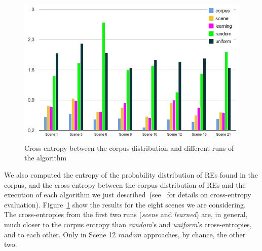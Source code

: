\begin{figure}
\begin{center}
\vspace*{-.7cm}
\hspace*{-.3cm}\includegraphics[width=.55\textwidth]{images/entropy.jpg}
\end{center}
\vspace*{-.5cm}
\caption{Cross-entropy between the corpus distribution and different runs of the algorithm}\label{Entropy}
\end{figure}


We also computed the entropy of the probability distribution of REs found in the corpus, and the cross-entropy between the corpus distribution of REs and the execution of each algorithm we just described~(see~\cite{juraksky:spee08} for details on cross-entropy evaluation). Figure~\ref{Entropy} show the results for the eight scenes we are considering. 
%
%
%
The cross-entropies from the first two runs (\emph{scene} and \emph{learned}) are, in general, much closer to the corpus entropy than \emph{random}'s and \emph{uniform}'s cross-entropies, and to each other.  Only in Scene 12 \emph{random} approaches, by chance, the other two. 
%



